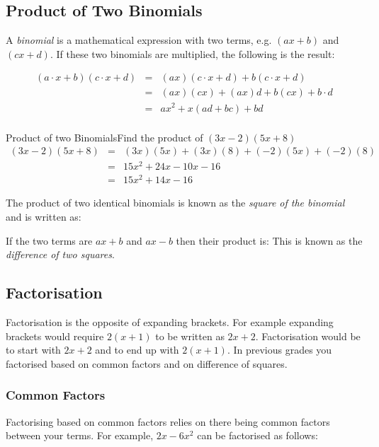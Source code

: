 \documentclass[10pt,a4paper,titlepage,twoside,openright]{report}
\begin{document}
\subsection{Product of Two Binomials}
\label{m:seg10:recap:productofbinomials}

A \textit{binomial} is a mathematical expression with two terms, e.g. $(ax + b)$ and $(cx + d)$.  If these two binomials are multiplied, the following is the result:

\begin{eqnarray*}
(a\cdot x + b)(c\cdot x + d) &=& (ax)(c\cdot x + d) + b(c\cdot x + d)\\
&=&(ax)(cx) + (ax)d + b(cx) + b\cdot d\\
&=&ax^2 + x(ad+bc) + bd\\
\end{eqnarray*}

\begin{wex}{Product of two Binomials}{Find the product of $(3x-2)(5x+8)$}{
\begin{eqnarray*}
(3x-2)(5x+8) &=&(3x)(5x)+(3x)(8)+(-2)(5x)+(-2)(8)\\
&=&15x^2+24x-10x-16\\
&=&15x^2+14x-16
\end{eqnarray*}}
\end{wex}

The product of two identical binomials is known as the \textit{square of the binomial} and is written as:

If the two terms are $ax+b$ and $ax-b$ then their product is:
This is known as the \textit{difference of two squares}.

\subsection{Factorisation}
Factorisation is the opposite of expanding brackets. For example expanding brackets would require $2(x+1)$ to be written as $2x+2$. Factorisation would be to start with $2x+2$ and to end up with $2(x+1)$. In previous grades you factorised based on common factors and on difference of squares.

\subsubsection{Common Factors}
Factorising based on common factors relies on there being common factors between your terms. For example, $2x-6x^2$ can be factorised as follows:
\end{document}

